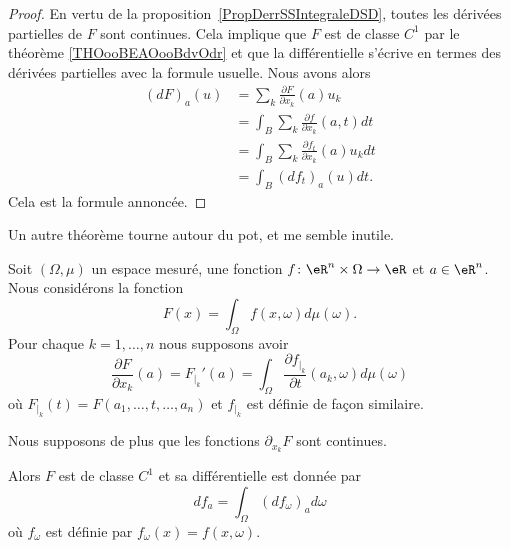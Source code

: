 \begin{proof}
    En vertu de la proposition~\ref{PropDerrSSIntegraleDSD}, toutes les dérivées partielles de \( F\) sont continues. Cela implique que \( F\) est de classe \( C^1\) par le théorème \ref{THOooBEAOooBdvOdr} et que la différentielle s'écrive en termes des dérivées partielles avec la formule usuelle. Nous avons alors
    \begin{subequations}
        \begin{align}
            (dF)_a(u)&=\sum_k\frac{ \partial F }{ \partial x_k }(a)u_k\\
            &=\int_B\sum_k\frac{ \partial f }{ \partial x_k }(a,t)dt\\
            &=\int_B\sum_k\frac{ \partial f_t }{ \partial x_k }(a)u_kdt\\
            &=\int_B (df_t)_a(u)dt.
        \end{align}
    \end{subequations}
    Cela est la formule annoncée.
\end{proof}

Un autre théorème tourne autour du pot, et me semble inutile.
\begin{theorem} \label{ThoOLAQyRL}
    Soit \( (\Omega,\mu)\) un espace mesuré, une fonction \( f\colon \eR^n\times \Omega\to \eR\) et \( a\in \eR^n\). Nous considérons la fonction
    \begin{equation}
        F(x)=\int_{\Omega}f(x,\omega)d\mu(\omega).
    \end{equation}
    Pour chaque \( k=1,\ldots, n\) nous supposons avoir
    \begin{equation}
        \frac{ \partial F }{ \partial x_k }(a)=F_{|_k}'(a)=\int_{\Omega}\frac{ \partial f_{|_k} }{ \partial t }(a_k,\omega)d\mu(\omega)
    \end{equation}
    où \( F_{|_k}(t)=F(a_1,\ldots, t,\ldots, a_n)\) et \( f_{|_k}\) est définie de façon similaire.

    Nous supposons de plus que les fonctions \( \partial_{x_k}F\) sont continues.

    Alors \( F\) est de classe \( C^1\) et sa différentielle est donnée par
    \begin{equation}
        df_a=\int_{\Omega}(df_{\omega})_ad\omega
    \end{equation}
    où \( f_{\omega}\) est définie par \( f_{\omega}(x)=f(x,\omega)\).
\end{theorem}

